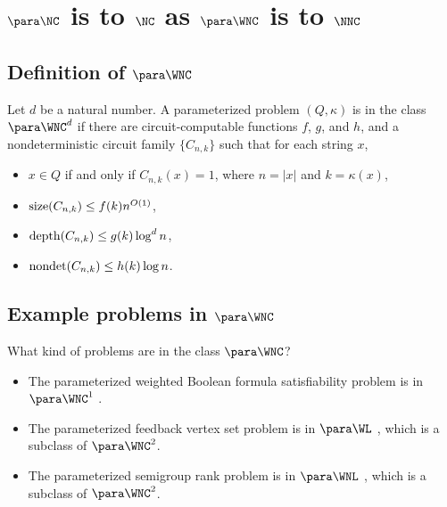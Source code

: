 \section{\texorpdfstring{$\para \NC$}{paraNC} is to \texorpdfstring{$\NC$}{NC} as \texorpdfstring{$\para \WNC$}{paraWNC} is to \texorpdfstring{$\NNC$}{NNC}}

\subsection{Definition of \texorpdfstring{$\para \WNC$}{paraWNC}}

\begin{definition}
  Let $d$ be a natural number.
  A parameterized problem $(Q, \kappa)$ is in the class $\para \WNC^d$ if there are circuit-computable functions $f$, $g$, and $h$, and a nondeterministic circuit family $\{C_{n, k}\}$ such that for each string $x$,
  \begin{itemize}
  \item $x \in Q$ if and only if $C_{n, k}(x) = 1$, where $n = |x|$ and $k = \kappa(x)$,
  \item $\operatorname{size}(C_{n, k}) \leq f(k) n^{O(1)}$,
  \item $\operatorname{depth}(C_{n, k}) \leq g(k) \log^d n$,
  \item $\operatorname{nondet}(C_{n, k}) \leq h(k) \log n$.
  \end{itemize}
\end{definition}

\subsection{Example problems in \texorpdfstring{$\para \WNC$}{paraWNC}}
\label{sec:rankinwp}

What kind of problems are in the class $\para \WNC$?

\begin{itemize}
\item The parameterized weighted Boolean formula satisfiability problem is in $\para \WNC^1$ \autocite[Theorem~3.6]{est15}.
\item The parameterized feedback vertex set problem is in $\para \WL$ \autocite[Section~4.3]{est15}, which is a subclass of $\para \WNC^2$.
\item The parameterized semigroup rank problem is in $\para \WNL$ \autocite[Theorem~3.12]{est15}, which is a subclass of $\para \WNC^2$.
\end{itemize}

